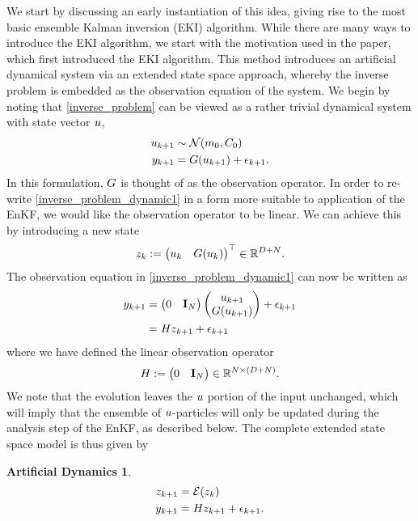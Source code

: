 \documentclass[12pt]{article}
\newtheorem{dynamics}{Artificial Dynamics}
\begin{document}
We start by discussing an early instantiation of this idea, giving rise to the most basic ensemble Kalman inversion (EKI) algorithm. 
While there are many ways to introduce the EKI algorithm, we start with the motivation used in the paper, which first introduced 
the EKI algorithm. This method introduces an artificial dynamical system via an extended state space approach, whereby the 
inverse problem is embedded as the observation equation of the system. We begin 
by noting that \ref{inverse_problem} can be viewed as a rather trivial dynamical system with state vector $\spar$,
\begin{align}
\dpar[\timeStep+1] &\sim \Gaussian(\priorMean, \priorCov) \label{inverse_problem_dynamic1} \\
\indexTimeStep[\timeStep+1]{\dataObs} &= \fwd(\dpar[\timeStep+1]) + \indexTimeStep[\timeStep+1]{\noise}. \nonumber
\end{align}
In this formulation, $\fwd$ is thought of as the observation operator. In order to re-write \ref{inverse_problem_dynamic1}
in a form more suitable to application of the EnKF, we would like the observation operator to be linear. We can achieve this
by introducing a new state
\begin{align}
\dexState := \begin{pmatrix} \dpar & \fwd(\dpar) \end{pmatrix}^\top \in \R^{\Npar + \dimData}.
\end{align}
The observation equation in \ref{inverse_problem_dynamic1} can now be written as 
\begin{align*}
\indexTimeStep[\timeStep+1]{\dataObs} 
&= \begin{pmatrix} 0 & \idMat_{\dimData} \end{pmatrix} \begin{pmatrix} \dpar[\timeStep+1] \\ \fwd(\dpar[\timeStep+1]) \end{pmatrix} + \indexTimeStep[\timeStep+1]{\noise} \\
&= \obsOpLin \dexState[\timeStep+1] + \indexTimeStep[\timeStep+1]{\noise} 
\end{align*}
where we have defined the linear observation operator 
\begin{align}
\obsOpLin := \begin{pmatrix} 0 & \idMat_{\dimData} \end{pmatrix} \in \R^{\dimData \times (\Npar + \dimData)}.
\end{align}
We note that the evolution leaves the $\spar$ portion of the input unchanged, which will imply that the ensemble of $\spar$-particles will 
only be updated during the analysis step of the EnKF, as described below. The complete extended state space
model is thus given by 
\begin{dynamics}
\begin{align}
\dexState[\timeStep+1] &= \mathcal{E}(\dexState[\timeStep]) \label{inverse_problem_dynamic} \\
\indexTimeStep[\timeStep+1]{\dataObs} &= \obsOpLin \dexState[\timeStep+1] + \indexTimeStep[\timeStep+1]{\noise} \nonumber.
\end{align}
\end{dynamics}
\end{document}
